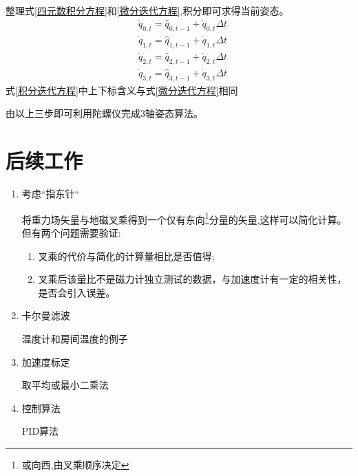 \documentclass[12pt,a4paper]{article}
\begin{document}
\begin{enumerate}
        整理式\ref{四元数积分方程}和\ref{微分迭代方程},积分即可求得当前姿态。
        \begin{equation} \label{积分迭代方程}
            \begin{aligned} 
                &\dot{q}_{0,t} = \hat{q}_{0,t-1} + \dot{q}_{0,t} \Delta t \\
                &\dot{q}_{1,t} = \hat{q}_{1,t-1} + \dot{q}_{1,t} \Delta t \\
                &\dot{q}_{2,t} = \hat{q}_{2,t-1} + \dot{q}_{2,t} \Delta t \\
                &\dot{q}_{3,t} = \hat{q}_{3,t-1} + \dot{q}_{3,t} \Delta t
            \end{aligned}
        \end{equation} 
        式\ref{积分迭代方程}中上下标含义与式\ref{微分迭代方程}相同
\end{enumerate}

由以上三步即可利用陀螺仪完成3轴姿态算法。

\section{后续工作}
\begin{enumerate}
    \item 考虑“指东针“

        将重力场矢量与地磁叉乘得到一个仅有东向\footnote{或向西,由叉乘顺序决定}分量的矢量,这样可以简化计算。但有两个问题需要验证:
        \begin{enumerate}
            \item 叉乘的代价与简化的计算量相比是否值得;
            \item 叉乘后该量比不是磁力计独立测试的数据，与加速度计有一定的相关性，是否会引入误差。
        \end{enumerate} 
    \item 卡尔曼滤波

        温度计和房间温度的例子
    \item 加速度标定

        取平均或最小二乘法
    \item 控制算法

        PID算法
\end{enumerate}

\newpage
\renewcommand\refname{参考文献}
\centering %


\end{document}
